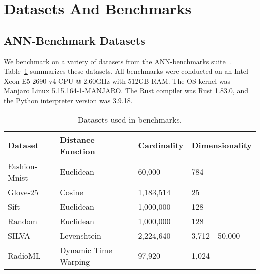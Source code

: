 \section{Datasets And Benchmarks}
\label{sec:datasets-and-benchmarks}

\subsection{ANN-Benchmark Datasets}
\label{sec:datasets-and-benchmarks:ann-benchmark-datasets}

We benchmark on a variety of datasets from the ANN-benchmarks suite~\cite{aumuller2020ann}.
Table~\ref{tab:datasets:summary} summarizes these datasets.
All benchmarks were conducted on an Intel Xeon E5-2690 v4 CPU @ 2.60GHz with 512GB RAM.
The OS kernel was Manjaro Linux 5.15.164-1-MANJARO.
The Rust compiler was Rust 1.83.0, and the Python interpreter version was 3.9.18.

\begin{table}
    \caption{Datasets used in benchmarks.}
    \label{tab:datasets:summary}
    \begin{center}
        \begin{sc}
            \begin{tabular}{|l|l|l|l|}
                \hline
                \textbf{Dataset} & \textbf{Distance Function}  &\textbf{Cardinality}  & \textbf{Dimensionality}  \\
                \hline
                Fashion-Mnist    & Euclidean                   & 60,000             & 784                    \\
                \hline
                Glove-25         & Cosine                      & 1,183,514          & 25                     \\
                \hline
                Sift             & Euclidean                   & 1,000,000          & 128                    \\
                \hline
                Random           & Euclidean                   & 1,000,000          & 128                    \\
                \hline
                SILVA            & Levenshtein                 & 2,224,640          & 3,712 - 50,000         \\
                \hline
                RadioML          & Dynamic Time Warping        & 97,920             & 1,024                  \\
                \hline
            \end{tabular}
        \end{sc}
    \end{center}
    \vskip -0.1in
\end{table}

